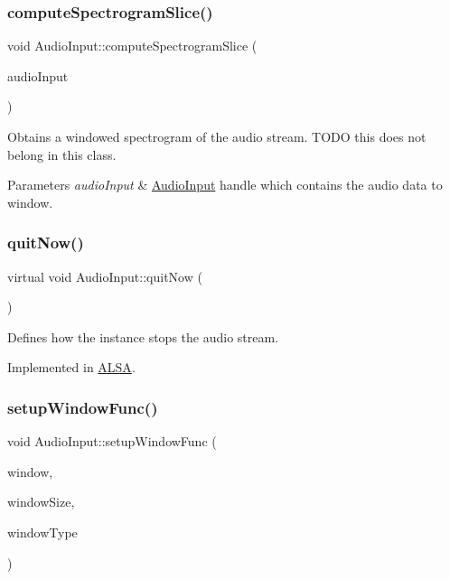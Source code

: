 \subsubsection{\texorpdfstring{compute\+Spectrogram\+Slice()}{computeSpectrogramSlice()}}
{\ttfamily void Audio\+Input\+::compute\+Spectrogram\+Slice (\begin{DoxyParamCaption}\item[{\hyperlink{classAudioInput}{Audio\+Input} $\ast$}]{audio\+Input }\end{DoxyParamCaption})\hspace{0.3cm}{\ttfamily [static]}}

Obtains a windowed spectrogram of the audio stream. T\+O\+DO this does not belong in this class. 
\begin{DoxyParams}{Parameters}
{\em audio\+Input} & \hyperlink{classAudioInput}{Audio\+Input} handle which contains the audio data to window. \\
\hline
\end{DoxyParams}
\hypertarget{classAudioInput_a4fce5476455b1df813f1cb6eebb08311}{}\label{classAudioInput_a4fce5476455b1df813f1cb6eebb08311} 
\subsubsection{\texorpdfstring{quit\+Now()}{quitNow()}}
{\ttfamily virtual void Audio\+Input\+::quit\+Now (\begin{DoxyParamCaption}{ }\end{DoxyParamCaption})\hspace{0.3cm}{\ttfamily [pure virtual]}}

Defines how the instance stops the audio stream. 

Implemented in \hyperlink{classALSA_a69dea83cc1785dd4c88bd1a9a02ac4b3}{A\+L\+SA}.

\hypertarget{classAudioInput_ad4485ea7937dd99442119dce52f7408d}{}\label{classAudioInput_ad4485ea7937dd99442119dce52f7408d} 
\subsubsection{\texorpdfstring{setup\+Window\+Func()}{setupWindowFunc()}}
{\ttfamily void Audio\+Input\+::setup\+Window\+Func (\begin{DoxyParamCaption}\item[{float $\ast$}]{window,  }\item[{int}]{window\+Size,  }\item[{unsigned int}]{window\+Type }\end{DoxyParamCaption})}

